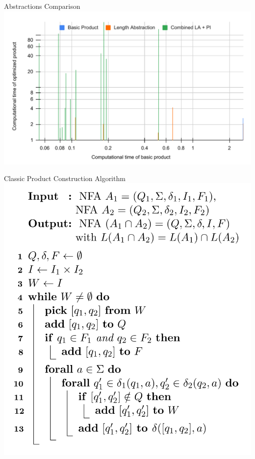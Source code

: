 \begin{frame}{Abstractions Comparison}
    \center\includegraphics[scale=0.5]{img/la_pi_stacked_time.pdf}
\end{frame}

\begin{frame}{Classic Product Construction Algorithm}
    \center\includegraphics[scale=0.35]{img/algorithm_classic_product_construction.png}
\end{frame}

